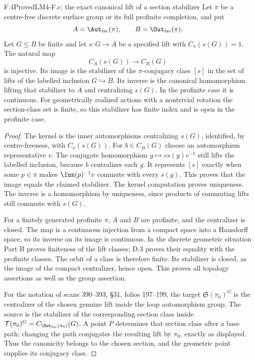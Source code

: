 \begin{claim}{F.4}{Proved}{LM4-F.c: the exact canonical lift of a section stabilizer}
\label{LM4-F.c}
Let $\pi$ be a centre-free discrete surface group or its full profinite completion, and put
\[
 A=\Aut_{\rm lac}(\pi),\qquad B=\Out_{\rm lac}(\pi).
\]
Let $G\leq B$ be finite and let $s:G\to A$ be a specified lift with $C_\pi(s(G))=1$. The natural map
\[
 C_A(s(G))\longrightarrow C_B(G)
\]
is injective. Its image is the stabilizer of the $\pi$-conjugacy class $[s]$ in the set of lifts of the labelled inclusion $G\hookrightarrow B$. Its inverse is the canonical homomorphism lifting that stabilizer to $A$ and centralizing $s(G)$. In the profinite case it is continuous. For geometrically realized actions with a nontrivial rotation the section-class set is finite, so this stabilizer has finite index and is open in the profinite case.
\end{claim}
\begin{proof}
The kernel is the inner automorphisms centralizing $s(G)$, identified, by centre-freeness, with $C_\pi(s(G))$. For $b\in C_B(G)$ choose an automorphism representative $v$. The conjugate homomorphism $g\mapsto vs(g)v^{-1}$ still lifts the labelled inclusion, because $b$ centralizes each $g$. It represents $[s]$ exactly when some $p\in\pi$ makes $\Inn(p)^{-1}v$ commute with every $s(g)$. This proves that the image equals the claimed stabilizer. The kernel computation proves uniqueness. The inverse is a homomorphism by uniqueness, since products of commuting lifts still commute with $s(G)$.

For a finitely generated profinite $\pi$, $A$ and $B$ are profinite, and the centralizer is closed. The map is a continuous injection from a compact space into a Hausdorff space, so its inverse on its image is continuous. In the discrete geometric situation Part B proves finiteness of the lift classes; D.3 proves their equality with the profinite classes. The orbit of a class is therefore finite. Its stabilizer is closed, as the image of the compact centralizer, hence open. This proves all topology assertions as well as the group assertion.

For the notation of scans 390--393, \S31, folios 197--199, the target $\mathfrak S(\pi_0)^G$ is the centralizer of the chosen genuine lift inside the loop automorphism group. The source is the stabilizer of the corresponding section class inside $\mathcal T(\pi_0)^G=C_{\Out_{\rm lac}(\pi_0)}(G)$. A point $P$ determines that section class after a base path; changing the path conjugates the resulting lift by $\pi_0$, exactly as displayed. Thus the canonicity belongs to the chosen section, and the geometric point supplies its conjugacy class.
\end{proof}

